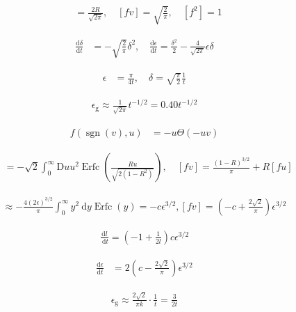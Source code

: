 \documentclass{article}
\begin{document}
\begin{align*}
[f u] &= \frac{2 R}{\sqrt{2 \pi}}, \quad [f v] = \sqrt{\frac{2}{\pi}}, \quad [f^{2}] = 1 \tag{8.64}
\end{align*}

\begin{align*}
\frac{\mathrm{d} \delta}{\mathrm{d} t} &= -\sqrt{\frac{2}{\pi}} \delta^{2}, \quad \frac{\mathrm{d} \epsilon}{\mathrm{d} t} = \frac{\delta^{2}}{2} - \frac{4}{\sqrt{2 \pi}} \epsilon \delta \tag{8.65}
\end{align*}

\begin{align*}
\epsilon &= \frac{\pi}{4 t}, \quad \delta = \sqrt{\frac{\pi}{2}} \frac{1}{t} \tag{8.66}
\end{align*}

\begin{align*}
\epsilon_{\mathrm{g}} \approx \frac{1}{\sqrt{2 \pi}} t^{-1 / 2}=0.40 t^{-1 / 2}
\tag{8.67}
\end{align*}

\begin{align*}
f(\operatorname{sgn}(v), u) &= -u \Theta(-u v) \tag{8.68}
\end{align*}

\begin{align*}
[f u] &= -\sqrt{2} \int_{0}^{\infty} \mathrm{D} u u^{2} \operatorname{Erfc}\left(\frac{R u}{\sqrt{2(1 - R^{2})}}\right), \quad [f v] = \frac{(1 - R)^{3/2}}{\pi} + R [f u] \tag{8.69}
\end{align*}

\begin{align*}
[f u] \approx-\frac{4(2 \epsilon)^{3 / 2}}{\pi} \int_{0}^{\infty} y^{2} \mathrm{~d} y \operatorname{Erfc}(y)=-c \epsilon^{3 / 2},[f v]=\left(-c+\frac{2 \sqrt{2}}{\pi}\right) \epsilon^{3 / 2}
\tag{8.70}
\end{align*}

\begin{align*}
\frac{\mathrm{d} l}{\mathrm{~d} t}=\left(-1+\frac{1}{2 l}\right) c \epsilon^{3 / 2}
\tag{8.71}
\end{align*}

\begin{align*}
\frac{\mathrm{d} \epsilon}{\mathrm{d} t} &= 2\left(c - \frac{2 \sqrt{2}}{\pi}\right) \epsilon^{3/2} \tag{8.72}
\end{align*}

\begin{align*}
\epsilon_{\mathrm{g}} \approx \frac{2 \sqrt{2}}{\pi k} \cdot \frac{1}{t}=\frac{3}{2 t}
\tag{8.73}
\end{align*}
\end{document}
